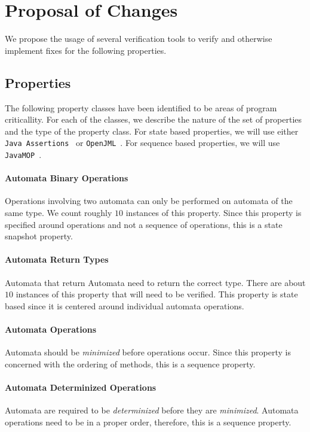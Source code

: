 \documentclass[letterpaper,11pt,twocolumn]{article}
\begin{document}
\section{Proposal of Changes}

We propose the usage of several verification tools to verify and otherwise
implement fixes for the following properties.

\subsection{Properties}

The following property classes have been identified to be areas of program
criticallity.  For each of the classes, we describe the nature of the set of
properties and the type of the property class.  For state based properties, we
will use either \texttt{Java Assertions}~\cite{oracle-java-assertions} or
\texttt{OpenJML}~\cite{openjml}.  For sequence based properties, we will use
\texttt{JavaMOP}~\cite{javamop}.

\paragraph{Automata Binary Operations} Operations involving two automata can
only be performed on automata of the same type.  We count roughly \(10\)
instances of this property.  Since this property is specified around operations
and not a sequence of operations, this is a state snapshot property.

\paragraph{Automata Return Types} Automata that return Automata need to
return the correct type.  There are about \(10\) instances of this property
that will need to be verified.  This property is state based since it is
centered around individual automata operations.

\paragraph{Automata Operations} Automata should be \textit{minimized} before
operations occur.  Since this property is concerned with the ordering of
methods, this is a sequence property.

\paragraph{Automata Determinized Operations} Automata are required to be
\textit{determinized} before they are \textit{minimized}.  Automata operations
need to be in a proper order, therefore, this is a sequence property.
\end{document}
